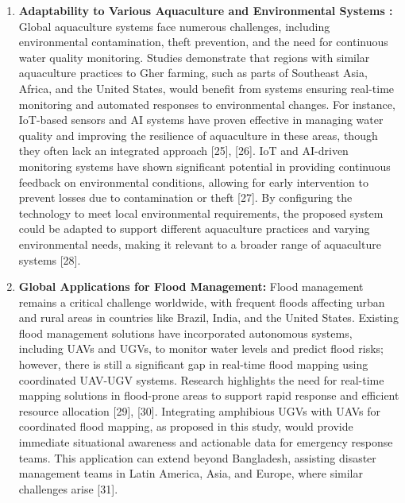 \documentclass[conference]{IEEEtran}
\begin{document}
\begin{enumerate}
	\item \textbf{Adaptability to Various Aquaculture and Environmental Systems :}
Global aquaculture systems face numerous challenges, including environmental contamination, theft prevention, and the need for continuous water quality monitoring. Studies demonstrate that regions with similar aquaculture practices to Gher farming, such as parts of Southeast Asia, Africa, and the United States, would benefit from systems ensuring real-time monitoring and automated responses to environmental changes. For instance, IoT-based sensors and AI systems have proven effective in managing water quality and improving the resilience of aquaculture in these areas, though they often lack an integrated approach [25], [26]. IoT and AI-driven monitoring systems have shown significant potential in providing continuous feedback on environmental conditions, allowing for early intervention to prevent losses due to contamination or theft [27]. By configuring the technology to meet local environmental requirements, the proposed system could be adapted to support different aquaculture practices and varying environmental needs, making it relevant to a broader range of aquaculture systems [28].	
	
	\item \textbf{ Global Applications for Flood Management:}
	Flood management remains a critical challenge worldwide, with frequent floods affecting urban and rural areas in countries like Brazil, India, and the United States. Existing flood management solutions have incorporated autonomous systems, including UAVs and UGVs, to monitor water levels and predict flood risks; however, there is still a significant gap in real-time flood mapping using coordinated UAV-UGV systems. Research highlights the need for real-time mapping solutions in flood-prone areas to support rapid response and efficient resource allocation [29], [30]. Integrating amphibious UGVs with UAVs for coordinated flood mapping, as proposed in this study, would provide immediate situational awareness and actionable data for emergency response teams. This application can extend beyond Bangladesh, assisting disaster management teams in Latin America, Asia, and Europe, where similar challenges arise [31].
	

\end{enumerate}
\end{document}
